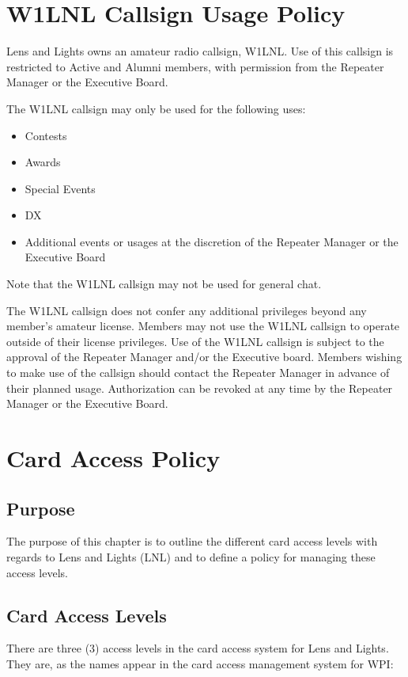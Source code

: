 \documentclass[12pt,letterpaper,oneside]{book}
\begin{document}
\chapter{W1LNL Callsign Usage Policy}
Lens and Lights owns an amateur radio callsign, W1LNL. Use of this callsign is
restricted to Active and Alumni members, with permission from the Repeater
Manager or the Executive Board.

The W1LNL callsign may only be used for the following uses:
\begin{itemize}
\item Contests
\item Awards
\item Special Events
\item DX
\item Additional events or usages at the discretion of the Repeater Manager or
    the Executive Board
\end{itemize}

Note that the W1LNL callsign may not be used for general chat.

The W1LNL callsign does not confer any additional privileges beyond any member's
amateur license. Members may not use the W1LNL callsign to operate outside of
their license privileges. Use of the W1LNL callsign is subject to the approval
of the Repeater Manager and/or the Executive board. Members wishing to make use
of the callsign should contact the Repeater Manager in advance of their planned
usage. Authorization can be revoked at any time by the Repeater Manager or the
Executive Board.


\chapter{Card Access Policy}

\section{Purpose}
The purpose of this chapter is to outline the different card access levels with regards to Lens and Lights (LNL) and to define a policy for managing these access levels.

\section{Card Access Levels}
There are three (3) access levels in the card access system for Lens and Lights. They are, as the names appear in the card access management system for WPI:
\end{document}

